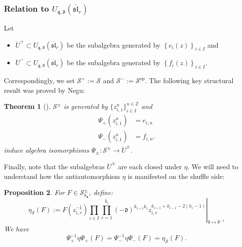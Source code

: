 \documentclass{amsart}
\newcommand{\Z}{\mathbb{Z}}
\newcommand{\qqq}{\mathfrak{q}}
\newcommand{\ddd}{\mathfrak{d}}
\newtheorem{thm}{Theorem}
\newtheorem{prop}[thm]{Proposition}
\theoremstyle{remark}
\numberwithin{thm}{section}
\numberwithin{equation}{section}
\begin{document}
\subsubsection{Relation to $U_{\qqq,\ddd}(\ddot{\mathfrak{sl}_r})$}
Let
\begin{itemize}
\item $\ddot{U}^+\subset U_{\qqq,\ddd}(\ddot{\mathfrak{sl}_r})$ be the subalgebra generated by $\left\{ e_{i}(z) \right\}_{i\in I}$ and
\item $\ddot{U}^-\subset U_{\qqq,\ddd}(\ddot{\mathfrak{sl}_r})$ be the subalgebra generated by $\left\{ f_{i}(z) \right\}_{i\in I}$.
\end{itemize}
Correspondingly, we set $\mathcal{S}^+:=\mathcal{S}$ and $\mathcal{S}^-:=\mathcal{S}^{op}$.
The following key structural result was proved by Negu:
\begin{thm}[\cite{Neg}]\label{ShuffTor}
$\mathcal{S}^\pm$ is generated by $\{z_{i,1}^n\}_{i\in I}^{n\in\Z}$ and
\begin{align*}
\Psi_+(z_{i,1}^n)&= e_{i,n}\\
\Psi_-(z_{i,1}^n)&= f_{i,n}.
\end{align*}
induce algebra isomorphisms $\Psi_{\pm}:\mathcal{S}^\pm\rightarrow\ddot{U}^\pm$.
\end{thm}
Finally, note that the subalgebras $\ddot{U}^\pm$ are each closed under $\eta$.
We will need to understand how the antiautomorphism $\eta$ is manifested on the shuffle side:
\begin{prop}\label{EtaShuff}
For $F\in\mathcal{S}^\pm_{k_\bullet}$, define:
\[
\eta_{\mathcal{S}}(F):=
 \left.F(z_{i,r}^{-1})\prod_{i\in I}\prod_{r=1}^{k_i}(-\ddd)^{k_{i+1}k_i} z_{i,r}^{k_{i+1}+k_{i-1}-2(k_i-1)}\right|_{\ddd\mapsto\ddd^{-1}}
\]
We have
\begin{equation}
\Psi_+^{-1}\eta\Psi_+(F)=\Psi_-^{-1}\eta\Psi_-(F)=\eta_{\mathcal{S}}(F) 
.
\label{EtaShuffEq}
\end{equation}
\end{prop}
\end{document}
